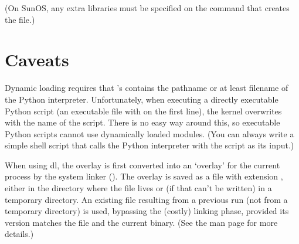 (On SunOS, any extra libraries must be specified on the 
command that creates the  file.)


\section{Caveats}

Dynamic loading requires that 's  contains
the pathname or at least filename of the Python interpreter.
Unfortunately, when executing a directly executable Python script (an
executable file with  on the first line), the kernel
overwrites  with the name of the script.  There is no
easy way around this, so executable Python scripts cannot use
dynamically loaded modules.  (You can always write a simple shell
script that calls the Python interpreter with the script as its
input.)

When using dl, the overlay is first converted into an `overlay' for
the current process by the system linker ().  The overlay is
saved as a file with extension , either in the directory
where the  file lives or (if that can't be written) in a
temporary directory.  An existing  file resulting from a
previous run (not from a temporary directory) is used, bypassing the
(costly) linking phase, provided its version matches the 
file and the current binary.  (See the  man page for more
details.)






